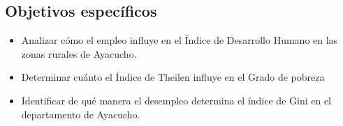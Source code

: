 \subsection{Objetivos específicos}

\begin{itemize}
\item Analizar cómo el empleo influye en el Índice de Desarrollo Humano en las zonas rurales de Ayacucho.
\item Determinar cuánto el Índice de Theilen influye en el Grado de pobreza 
\item Identificar de qué manera el desempleo determina el índice de Gini en el departamento de Ayacucho.

\end{itemize}

